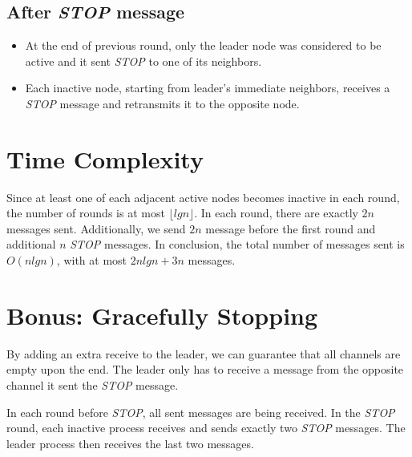 \documentclass{article}
\begin{document}
\subsection{After \textit{STOP} message}
\begin{itemize}
    \item At the end of previous round, only the leader node was considered to be active and it sent \textit{STOP} to one of its neighbors.
    \item Each inactive node, starting from leader's immediate neighbors, receives a \textit{STOP} message and retransmits it to the opposite node.
\end{itemize}
\section{Time Complexity}
Since at least one of each adjacent active nodes becomes inactive in each round, the number of rounds is at most $\lfloor lgn \rfloor$. In each round, there are exactly $2n$ messages sent. Additionally, we send $2n$ message before the first round and additional $n$ \textit{STOP} messages.
In conclusion, the total number of messages sent is $O(nlgn)$, with at most $2nlgn + 3n$ messages.
\section{Bonus: Gracefully Stopping}
By adding an extra receive to the leader, we can guarantee that all channels are empty upon the end. The leader only has to receive a message from the opposite channel it sent the \textit{STOP} message.

In each round before \textit{STOP}, all sent messages are being received.
In the \textit{STOP} round, each inactive process receives and sends exactly two \textit{STOP} messages. The leader process then receives the last two messages.

\printbibliography
\end{document}
